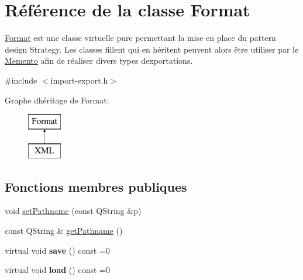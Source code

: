 \hypertarget{class_format}{}\section{Référence de la classe Format}
\label{class_format}


\hyperlink{class_format}{Format} est une classe virtuelle pure permettant la mise en place du pattern design Strategy. Les classes fillent qui en héritent peuvent alors être utiliser par le \hyperlink{class_memento}{Memento} afin de réaliser divers types d\textquotesingle{}exportations.  




{\ttfamily \#include $<$import-\/export.\+h$>$}

Graphe d\textquotesingle{}héritage de Format\+:\begin{figure}[H]
\begin{center}
\leavevmode
\includegraphics[height=2.000000cm]{class_format}
\end{center}
\end{figure}
\subsection*{Fonctions membres publiques}
\begin{DoxyCompactItemize}
\item 
void \hyperlink{class_format_ad4549bc7712d09a5fd8874e5cffd7c9b}{set\+Pathname} (const Q\+String \&p)
\item 
const Q\+String \& \hyperlink{class_format_a8ef3acfd8d6d5be588e31e6a4a1d789b}{get\+Pathname} ()
\item 
\hypertarget{class_format_a4e2330d6894994551b607e5cbfab42bc}{}virtual void {\bfseries save} () const =0\label{class_format_a4e2330d6894994551b607e5cbfab42bc}

\item 
\hypertarget{class_format_aa571fc1c38b61945d15b999088f43094}{}virtual void {\bfseries load} () const =0\label{class_format_aa571fc1c38b61945d15b999088f43094}

\end{DoxyCompactItemize}
